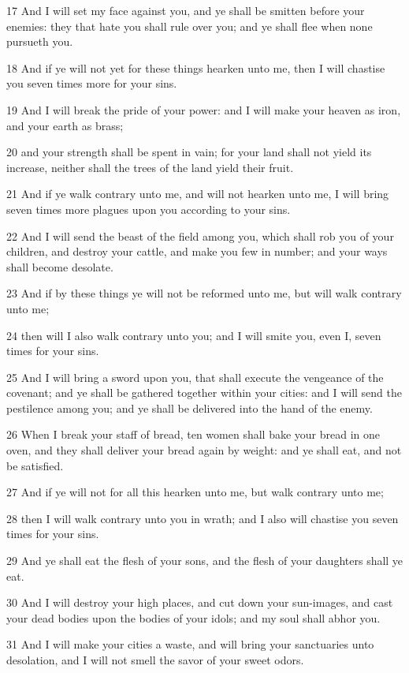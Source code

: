 \par 17 And I will set my face against you, and ye shall be smitten before your enemies: they that hate you shall rule over you; and ye shall flee when none pursueth you.
\par 18 And if ye will not yet for these things hearken unto me, then I will chastise you seven times more for your sins.
\par 19 And I will break the pride of your power: and I will make your heaven as iron, and your earth as brass;
\par 20 and your strength shall be spent in vain; for your land shall not yield its increase, neither shall the trees of the land yield their fruit.
\par 21 And if ye walk contrary unto me, and will not hearken unto me, I will bring seven times more plagues upon you according to your sins.
\par 22 And I will send the beast of the field among you, which shall rob you of your children, and destroy your cattle, and make you few in number; and your ways shall become desolate.
\par 23 And if by these things ye will not be reformed unto me, but will walk contrary unto me;
\par 24 then will I also walk contrary unto you; and I will smite you, even I, seven times for your sins.
\par 25 And I will bring a sword upon you, that shall execute the vengeance of the covenant; and ye shall be gathered together within your cities: and I will send the pestilence among you; and ye shall be delivered into the hand of the enemy.
\par 26 When I break your staff of bread, ten women shall bake your bread in one oven, and they shall deliver your bread again by weight: and ye shall eat, and not be satisfied.
\par 27 And if ye will not for all this hearken unto me, but walk contrary unto me;
\par 28 then I will walk contrary unto you in wrath; and I also will chastise you seven times for your sins.
\par 29 And ye shall eat the flesh of your sons, and the flesh of your daughters shall ye eat.
\par 30 And I will destroy your high places, and cut down your sun-images, and cast your dead bodies upon the bodies of your idols; and my soul shall abhor you.
\par 31 And I will make your cities a waste, and will bring your sanctuaries unto desolation, and I will not smell the savor of your sweet odors.
